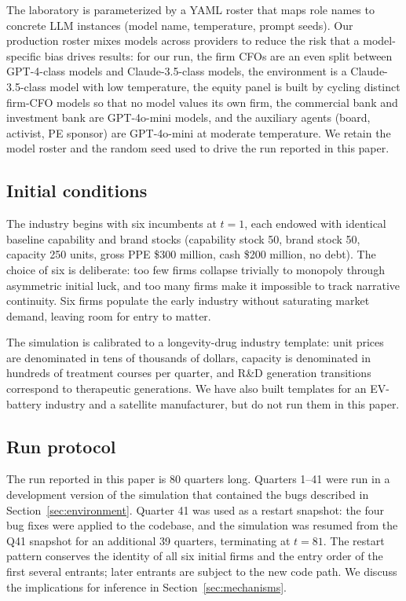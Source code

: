 \documentclass[11pt]{article}
\begin{document}
The laboratory is parameterized by a YAML roster that maps role names
to concrete LLM instances (model name, temperature, prompt seeds). Our
production roster mixes models across providers to reduce the risk that
a model-specific bias drives results: for our run, the firm CFOs are an
even split between GPT-4-class models and Claude-3.5-class models, the
environment is a Claude-3.5-class model with low temperature, the
equity panel is built by cycling distinct firm-CFO models so that no
model values its own firm, the commercial bank and investment bank are
GPT-4o-mini models, and the auxiliary agents (board, activist, PE
sponsor) are GPT-4o-mini at moderate temperature. We retain the model
roster and the random seed used to drive the run reported in this paper.

\subsection{Initial conditions}

The industry begins with six incumbents at $t=1$, each endowed with
identical baseline capability and brand stocks (capability stock 50,
brand stock 50, capacity 250 units, gross PPE \$300 million, cash
\$200 million, no debt). The choice of six is deliberate: too few firms
collapse trivially to monopoly through asymmetric initial luck, and too
many firms make it impossible to track narrative continuity. Six firms
populate the early industry without saturating market demand, leaving
room for entry to matter.

The simulation is calibrated to a longevity-drug industry template: unit
prices are denominated in tens of thousands of dollars, capacity is
denominated in hundreds of treatment courses per quarter, and R\&D
generation transitions correspond to therapeutic generations. We have
also built templates for an EV-battery industry and a satellite
manufacturer, but do not run them in this paper.

\subsection{Run protocol}

The run reported in this paper is 80 quarters long. Quarters 1--41 were
run in a development version of the simulation that contained the bugs
described in Section~\ref{sec:environment}. Quarter 41 was used as a
restart snapshot: the four bug fixes were applied to the codebase, and
the simulation was resumed from the Q41 snapshot for an additional 39
quarters, terminating at $t=81$. The restart pattern conserves the
identity of all six initial firms and the entry order of the first
several entrants; later entrants are subject to the new code path. We
discuss the implications for inference in Section~\ref{sec:mechanisms}.
\end{document}
